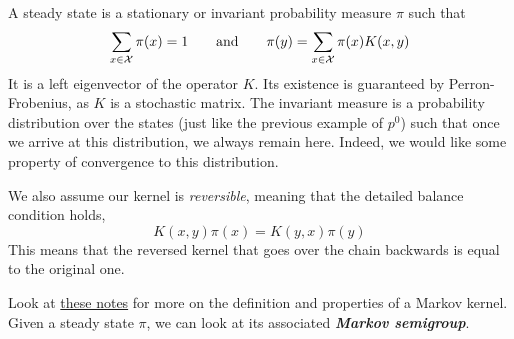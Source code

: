 A steady state is a stationary or invariant probability measure $\pi$  such that
\[
\sum_{x\in\mathcal{X}} \pi(x) = 1 \quad \quad \text{and} \quad \quad \pi(y)=\sum_{x\in\mathcal{X}}\pi(x)K(x,y)
\]
It is a left eigenvector of the operator $K$. Its existence is guaranteed by Perron-Frobenius, as $K$ is a stochastic matrix. The invariant measure is a probability distribution over the states (just like the previous example of $p^0$) such that once we arrive at this distribution, we always remain here. Indeed, we would like some property of convergence to this distribution. 

We also assume our kernel is \emph{reversible}, meaning that the detailed balance condition holds,
\[
K(x,y)\pi(x)=K(y,x)\pi(y)
\]
This means that the reversed kernel that goes over the chain backwards is equal to the original one.

Look at \href{https://www.stats.ox.ac.uk/~deligian/pdf/sc5/notes/notes4.pdf}{these notes} for more on the definition and properties of a Markov kernel.
\\

Given a steady state $\pi$, we can look at its associated \textbf{\emph{Markov semigroup}}. 

